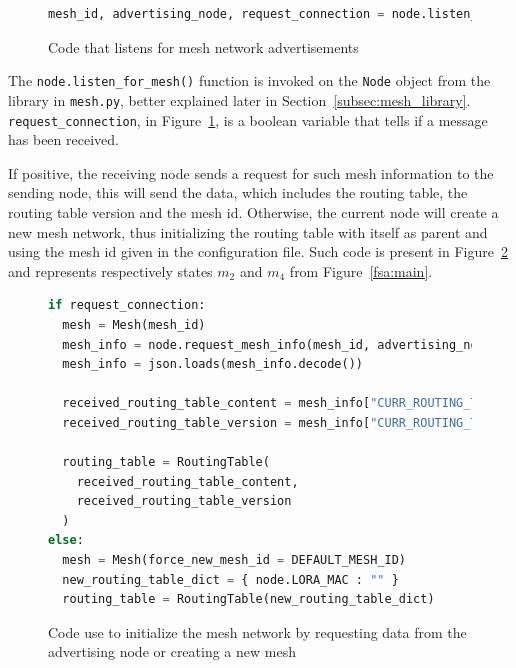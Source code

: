 				\begin{figure}[H]
					\begin{lstlisting}[language=python]
mesh_id, advertising_node, request_connection = node.listen_for_mesh(180)
					\end{lstlisting}		
					\caption{Code that listens for mesh network advertisements}
					\label{code:mesh_init_1}
				\end{figure}
			
				The \texttt{node.listen\_for\_mesh()} function is invoked on the \texttt{Node} object from the library in \texttt{mesh.py}, better explained later in Section~\ref{subsec:mesh_library}.				
				\texttt{request\_connection}, in Figure~\ref{code:mesh_init_1}, is a boolean variable that tells if a message has been received.
				
				If positive, the receiving node sends a request for such mesh information to the sending node, this will send the data, which includes the routing table, the routing table version and the mesh id.
				Otherwise, the current node will create a new mesh network, thus initializing the routing table with itself as parent and using the mesh id given in the configuration file.
				Such code is present in Figure~\ref{code:mesh_init_2} and represents respectively states $m_{2}$ and $m_{4}$ from Figure~\ref{fsa:main}.
									
				\begin{figure}	
					\begin{lstlisting}[language=python]
if request_connection:
  mesh = Mesh(mesh_id)
  mesh_info = node.request_mesh_info(mesh_id, advertising_node)
  mesh_info = json.loads(mesh_info.decode())

  received_routing_table_content = mesh_info["CURR_ROUTING_TABLE_CONTENT"]
  received_routing_table_version = mesh_info["CURR_ROUTING_TABLE_VERSION"]
  
  routing_table = RoutingTable(
    received_routing_table_content, 
    received_routing_table_version
  )
else:
  mesh = Mesh(force_new_mesh_id = DEFAULT_MESH_ID)
  new_routing_table_dict = { node.LORA_MAC : "" }
  routing_table = RoutingTable(new_routing_table_dict)
					\end{lstlisting}
					\caption{Code use to initialize the mesh network by requesting data from the advertising node or creating a new mesh}
					\label{code:mesh_init_2}
				\end{figure}
			
	
